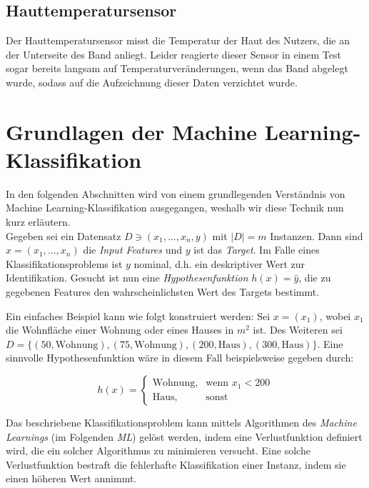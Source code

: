 \subsection{Hauttemperatursensor}
Der Hauttemperatursensor misst die Temperatur der Haut des Nutzers, die an der Unterseite des Band anliegt. Leider reagierte dieser Sensor in einem Test sogar bereits langsam auf Temperaturveränderungen, wenn das Band abgelegt wurde, sodass auf die Aufzeichnung dieser Daten verzichtet wurde.

\section{Grundlagen der Machine Learning-Klassifikation}
In den folgenden Abschnitten wird von einem grundlegenden Verständnis von Machine Learning-Klassifikation ausgegangen, weshalb wir diese Technik nun kurz erläutern. \\
Gegeben sei ein Datensatz $D \ni (x_1, ..., x_n, y)$ mit $|D| = m$ Instanzen. Dann sind $x = (x_1, ..., x_n)$ die \textit{Input Features} und $y$ ist das \textit{Target}. Im Falle eines Klassifikationsproblems ist $y$ nominal, d.h. ein deskriptiver Wert zur Identifikation. Gesucht ist nun eine \textit{Hypothesenfunktion} $h(x) = \hat{y}$, die zu gegebenen Features den wahrscheinlichsten Wert des Targets bestimmt\cite{Ng2011a}.

Ein einfaches Beispiel kann wie folgt konstruiert werden: Sei $x = (x_1)$, wobei $x_1$ die Wohnfläche einer Wohnung oder eines Hauses in $m^2$ ist. Des Weiteren sei $D = \{(50, \text{Wohnung}), (75, \text{Wohnung}), (200, \text{Haus}), (300, \text{Haus})\}$. Eine sinnvolle Hypothesenfunktion wäre in diesem Fall beispielsweise gegeben durch:

\[
h(x) = 
\begin{cases}
\text{Wohnung}, & \text{wenn } x_1 < 200 \\
\text{Haus}, & \text{sonst}
\end{cases}
\]

Das beschriebene Klassifikationsproblem kann mittels Algorithmen des \textit{Machine Learnings} (im Folgenden \textit{ML}) gelöst werden, indem eine Verlustfunktion definiert wird, die ein solcher Algorithmus zu minimieren versucht. Eine solche Verlustfunktion bestraft die fehlerhafte Klassifikation einer Instanz, indem sie einen höheren Wert annimmt.

